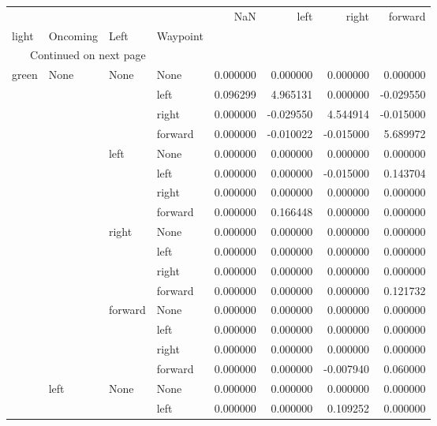 \documentclass{article}
\begin{document}
\begin{longtable}{llllrrrr}
\toprule
      &      &      &      &       NaN &      left &     right &   forward \\
light & Oncoming & Left & Waypoint &           &           &           &           \\
\midrule
\endhead
\midrule
\multicolumn{3}{r}{{Continued on next page}} \\
\midrule
\endfoot

\bottomrule
\endlastfoot
green & None & None & None &  0.000000 &  0.000000 &  0.000000 &  0.000000 \\
      &      &      & left &  0.096299 &  4.965131 &  0.000000 & -0.029550 \\
      &      &      & right &  0.000000 & -0.029550 &  4.544914 & -0.015000 \\
      &      &      & forward &  0.000000 & -0.010022 & -0.015000 &  5.689972 \\
      &      & left & None &  0.000000 &  0.000000 &  0.000000 &  0.000000 \\
      &      &      & left &  0.000000 &  0.000000 & -0.015000 &  0.143704 \\
      &      &      & right &  0.000000 &  0.000000 &  0.000000 &  0.000000 \\
      &      &      & forward &  0.000000 &  0.166448 &  0.000000 &  0.000000 \\
      &      & right & None &  0.000000 &  0.000000 &  0.000000 &  0.000000 \\
      &      &      & left &  0.000000 &  0.000000 &  0.000000 &  0.000000 \\
      &      &      & right &  0.000000 &  0.000000 &  0.000000 &  0.000000 \\
      &      &      & forward &  0.000000 &  0.000000 &  0.000000 &  0.121732 \\
      &      & forward & None &  0.000000 &  0.000000 &  0.000000 &  0.000000 \\
      &      &      & left &  0.000000 &  0.000000 &  0.000000 &  0.000000 \\
      &      &      & right &  0.000000 &  0.000000 &  0.000000 &  0.000000 \\
      &      &      & forward &  0.000000 &  0.000000 & -0.007940 &  0.060000 \\
      & left & None & None &  0.000000 &  0.000000 &  0.000000 &  0.000000 \\
      &      &      & left &  0.000000 &  0.000000 &  0.109252 &  0.000000 \\

\end{longtable}
\end{document}
